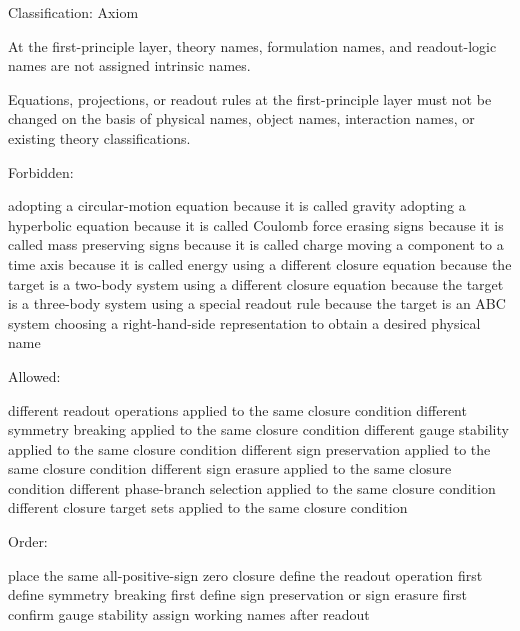 \documentclass[
  a4paper,
]{article}
\newenvironment{Shaded}{}{}
\newcommand{\NormalTok}[1]{#1}
\begin{document}
Classification: Axiom

At the first-principle layer, theory names, formulation names, and
readout-logic names are not assigned intrinsic names.

Equations, projections, or readout rules at the first-principle layer
must not be changed on the basis of physical names, object names,
interaction names, or existing theory classifications.

Forbidden:

\begin{Shaded}
\begin{Highlighting}[]
\NormalTok{adopting a circular{-}motion equation because it is called gravity}
\NormalTok{adopting a hyperbolic equation because it is called Coulomb force}
\NormalTok{erasing signs because it is called mass}
\NormalTok{preserving signs because it is called charge}
\NormalTok{moving a component to a time axis because it is called energy}
\NormalTok{using a different closure equation because the target is a two{-}body system}
\NormalTok{using a different closure equation because the target is a three{-}body system}
\NormalTok{using a special readout rule because the target is an ABC system}
\NormalTok{choosing a right{-}hand{-}side representation to obtain a desired physical name}
\end{Highlighting}
\end{Shaded}

Allowed:

\begin{Shaded}
\begin{Highlighting}[]
\NormalTok{different readout operations applied to the same closure condition}
\NormalTok{different symmetry breaking applied to the same closure condition}
\NormalTok{different gauge stability applied to the same closure condition}
\NormalTok{different sign preservation applied to the same closure condition}
\NormalTok{different sign erasure applied to the same closure condition}
\NormalTok{different phase{-}branch selection applied to the same closure condition}
\NormalTok{different closure target sets applied to the same closure condition}
\end{Highlighting}
\end{Shaded}

Order:

\begin{Shaded}
\begin{Highlighting}[]
\NormalTok{place the same all{-}positive{-}sign zero closure}
\NormalTok{define the readout operation first}
\NormalTok{define symmetry breaking first}
\NormalTok{define sign preservation or sign erasure first}
\NormalTok{confirm gauge stability}
\NormalTok{assign working names after readout}
\end{Highlighting}
\end{Shaded}
\end{document}
